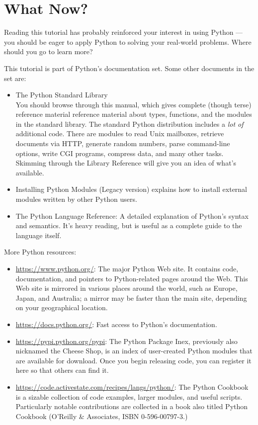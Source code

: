 \documentclass[UTF8]{article}
\begin{document}
\section{What Now?}
Reading this tutorial has probably reinforced your interest in using Python --- you should be eager
to apply Python to solving your real-world problems. Where should you go to learn more?

This tutorial is part of Python's documentation set. Some other documents in the set are:
\begin{itemize}
    \item The Python Standard Library \\
    You should browse through this manual, which gives complete (though terse) reference material
    reference material about types, functions, and the modules in the standard library. The
    standard Python distribution includes a \emph{lot of} additional code. There are modules to
    read Unix mailboxes, retrieve documents via HTTP, generate random numbers, parse command-line
    options, write CGI programs, compress data, and many other tasks. Skimming through the Library
    Reference will give you an idea of what's available.
    \item Installing Python Modules (Legacy version) explains how to install external modules
    written by other Python users.
    \item The Python Language Reference: A detailed explanation of Python's syntax and semantics.
    It's heavy reading, but is useful as a complete guide to the language itself.
\end{itemize}

More Python resources:
\begin{itemize}
    \item \url{https://www.python.org/}: The major Python Web site. It contains code, documentation,
    and pointers to Python-related pages around the Web. This Web site is mirrored in various
    places around the world, such as Europe, Japan, and Australia; a mirror may be faster than the
    main site, depending on your geographical location.
    \item \url{https://docs.python.org/}: Fast access to Python's documentation.
    \item \url{https://pypi.python.org/pypi}: The Python Package Inex, previously also nicknamed
    the Cheese Shop, is an index of user-created Python modules that are available for download.
    Once you begin releasing code, you can register it here so that others can find it.
    \item \url{https://code.activestate.com/recipes/langs/python/}: The Python Cookbook is a
    sizable collection of code examples, larger modules, and useful scripts. Particularly notable
    contributions are collected in a book also titled Python Cookbook (O'Reilly \& Associates, ISBN
    0-596-00797-3.)
\end{itemize}
\end{document}
